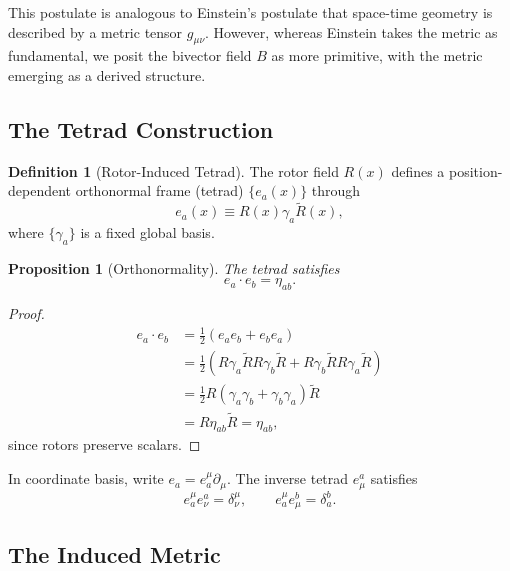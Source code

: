 \documentclass[11pt,a4paper]{article}
\numberwithin{equation}{section}
\theoremstyle{plain}
\newtheorem{proposition}[theorem]{Proposition}
\theoremstyle{definition}
\newtheorem{definition}[theorem]{Definition}
\theoremstyle{remark}
\newcommand{\rev}[1]{\widetilde{#1}}       %
\begin{document}
This postulate is analogous to Einstein's postulate that space-time geometry is described by a metric tensor $g_{\mu\nu}$. However, whereas Einstein takes the metric as fundamental, we posit the bivector field $B$ as more primitive, with the metric emerging as a derived structure.

\subsection{The Tetrad Construction}

\begin{definition}[Rotor-Induced Tetrad]
The rotor field $R(x)$ defines a position-dependent orthonormal frame (tetrad) $\{e_a(x)\}$ through
\begin{equation}
e_a(x) \equiv R(x) \gamma_a \rev{R}(x),
\label{eq:tetrad-construction}
\end{equation}
where $\{\gamma_a\}$ is a fixed global basis.
\end{definition}

\begin{proposition}[Orthonormality]
The tetrad satisfies
\begin{equation}
e_a \cdot e_b = \eta_{ab}.
\end{equation}
\end{proposition}

\begin{proof}
\begin{align}
e_a \cdot e_b &= \frac{1}{2}(e_a e_b + e_b e_a)\\
&= \frac{1}{2}\left(R\gamma_a\rev{R} R\gamma_b\rev{R} + R\gamma_b\rev{R} R\gamma_a\rev{R}\right)\\
&= \frac{1}{2}R(\gamma_a\gamma_b + \gamma_b\gamma_a)\rev{R}\\
&= R \eta_{ab} \rev{R} = \eta_{ab},
\end{align}
since rotors preserve scalars.
\end{proof}

In coordinate basis, write $e_a = e_a^\mu \partial_\mu$. The inverse tetrad $e^a_\mu$ satisfies
\begin{equation}
e_a^\mu e^a_\nu = \delta^\mu_\nu, \qquad e_a^\mu e^b_\mu = \delta^b_a.
\end{equation}

\subsection{The Induced Metric}
\end{document}
